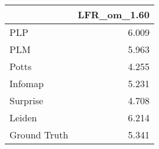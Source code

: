 \begin{tabular}{lr}
\toprule
{} & LFR_om_1.60 \\
\midrule
PLP          &       6.009 \\
PLM          &       5.963 \\
Potts        &       4.255 \\
Infomap      &       5.231 \\
Surprise     &       4.708 \\
Leiden       &       6.214 \\
Ground Truth &       5.341 \\
\bottomrule
\end{tabular}
